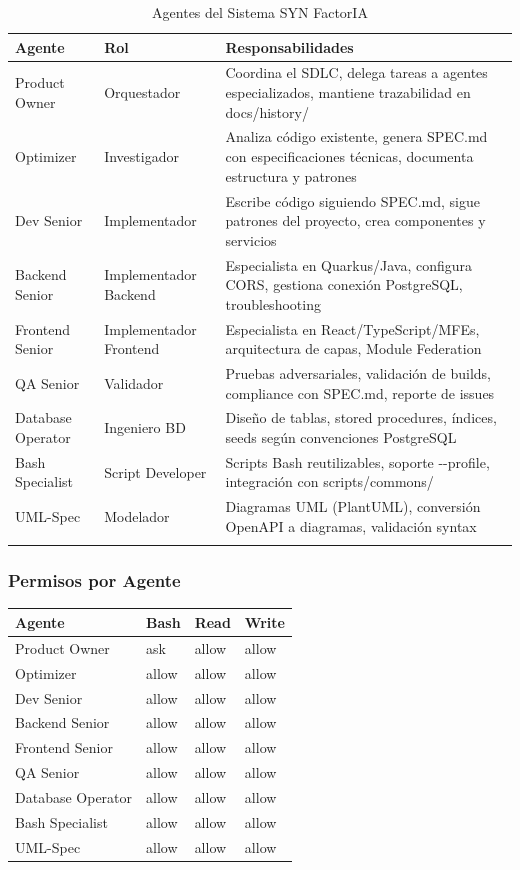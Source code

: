 \documentclass[12pt,a4paper,spanish]{article}
\begin{document}
\begin{longtable}{|p{3cm}|p{4cm}|p{6cm}|}
\toprule
\textbf{Agente} & \textbf{Rol} & \textbf{Responsabilidades} \\
\midrule
Product Owner & Orquestador & Coordina el SDLC, delega tareas a agentes especializados, mantiene trazabilidad en docs/history/ \\
\midrule
Optimizer & Investigador & Analiza código existente, genera SPEC.md con especificaciones técnicas, documenta estructura y patrones \\
\midrule
Dev Senior & Implementador & Escribe código siguiendo SPEC.md, sigue patrones del proyecto, crea componentes y servicios \\
\midrule
Backend Senior & Implementador Backend & Especialista en Quarkus/Java, configura CORS, gestiona conexión PostgreSQL, troubleshooting \\
\midrule
Frontend Senior & Implementador Frontend & Especialista en React/TypeScript/MFEs, arquitectura de capas, Module Federation \\
\midrule
QA Senior & Validador & Pruebas adversariales, validación de builds, compliance con SPEC.md, reporte de issues \\
\midrule
Database Operator & Ingeniero BD & Diseño de tablas, stored procedures, índices, seeds según convenciones PostgreSQL \\
\midrule
Bash Specialist & Script Developer & Scripts Bash reutilizables, soporte -{}-profile, integración con scripts/commons/ \\
\midrule
UML-Spec & Modelador & Diagramas UML (PlantUML), conversión OpenAPI a diagramas, validación syntax \\
\bottomrule
\caption{Agentes del Sistema SYN FactorIA}
\end{longtable}

\subsubsection{Permisos por Agente}

\begin{tabular}{p{3cm}|p{2cm}|p{2cm}|p{2cm}}
\toprule
\textbf{Agente} & \textbf{Bash} & \textbf{Read} & \textbf{Write} \\
\midrule
Product Owner & ask & allow & allow \\
\midrule
Optimizer & allow & allow & allow \\
\midrule
Dev Senior & allow & allow & allow \\
\midrule
Backend Senior & allow & allow & allow \\
\midrule
Frontend Senior & allow & allow & allow \\
\midrule
QA Senior & allow & allow & allow \\
\midrule
Database Operator & allow & allow & allow \\
\midrule
Bash Specialist & allow & allow & allow \\
\midrule
UML-Spec & allow & allow & allow \\
\bottomrule
\end{tabular}
\end{document}
